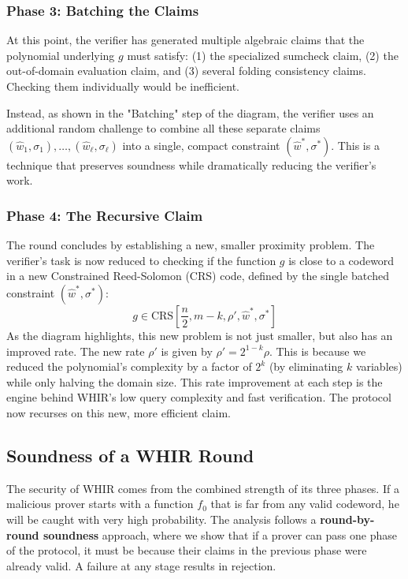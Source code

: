 \documentclass{article}
\begin{document}
\subsubsection{Phase 3: Batching the Claims}
At this point, the verifier has generated multiple algebraic claims that the polynomial underlying $g$ must satisfy: (1) the specialized sumcheck claim, (2) the out-of-domain evaluation claim, and (3) several folding consistency claims. Checking them individually would be inefficient.

Instead, as shown in the "Batching" step of the diagram, the verifier uses an additional random challenge to combine all these separate claims $(\hat{w}_1, \sigma_1), \dots, (\hat{w}_\ell, \sigma_\ell)$ into a single, compact constraint $(\hat{w}^*, \sigma^*)$. This is a technique that preserves soundness while dramatically reducing the verifier's work.

\subsubsection{Phase 4: The Recursive Claim}
The round concludes by establishing a new, smaller proximity problem. The verifier's task is now reduced to checking if the function $g$ is close to a codeword in a new Constrained Reed-Solomon (CRS) code, defined by the single batched constraint $(\hat{w}^*, \sigma^*)$:
\[
g \in \text{CRS}\left[\frac{n}{2}, m-k, \rho', \hat{w}^*, \sigma^*\right]
\]
As the diagram highlights, this new problem is not just smaller, but also has an improved rate. The new rate $\rho'$ is given by $\rho' = 2^{1-k} \rho$. This is because we reduced the polynomial's complexity by a factor of $2^k$ (by eliminating $k$ variables) while only halving the domain size. This rate improvement at each step is the engine behind WHIR's low query complexity and fast verification. The protocol now recurses on this new, more efficient claim.




\subsection{Soundness of a WHIR Round}

The security of WHIR comes from the combined strength of its three phases. If a malicious prover starts with a function $f_0$ that is far from any valid codeword, he will be caught with very high probability. The analysis follows a \textbf{round-by-round soundness} approach, where we show that if a prover can pass one phase of the protocol, it must be because their claims in the previous phase were already valid. A failure at any stage results in rejection.
\end{document}

